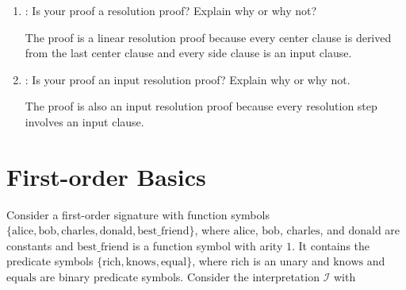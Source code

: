 \documentclass[solution]{acAssignment}
\begin{document}
\begin{enumerate}
    \item {}:
        Is your proof a resolution proof?
        Explain why or why not?
        
        \begin{acSolution}
            The proof is a linear resolution proof because every center clause is derived from the last center clause and every side clause is an input clause.
        \end{acSolution}
        
    \item {}:
        Is your proof an input resolution proof? Explain why or why not.
        
        \begin{acSolution}
            The proof is also an input resolution proof because every resolution step involves an input clause.
        \end{acSolution}
\end{enumerate}

\section{First-order Basics}

Consider a first-order signature with function symbols $\{\mathrm{alice, \mathrm{bob}, \mathrm{charles}, \mathrm{donald}, \mathrm{best\_friend}}\}$, where $\mathrm{alice}$, $\mathrm{bob}$, $\mathrm{charles}$, and $\mathrm{donald}$ are constants and $\mathrm{best\_friend}$ is a function symbol with arity $1$.
It contains the predicate symbols $\{\mathrm{rich}, \mathrm{knows}, \mathrm{equal}\}$, where $\mathrm{rich}$ is an unary and $\mathrm{knows}$ and $\mathrm{equals}$ are binary predicate symbols.
Consider the interpretation $\mathcal{I}$ with
\end{document}
